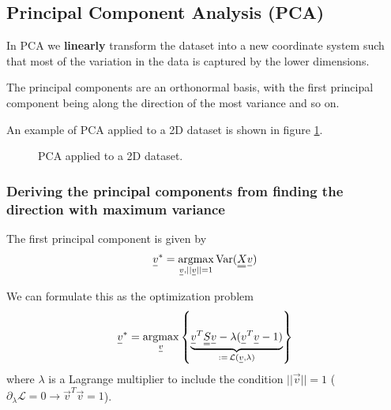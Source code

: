 \subsection{Principal Component Analysis (PCA)}
In PCA we \textbf{linearly} transform the dataset into a new coordinate system such that
most of the variation in the data is captured by the lower dimensions.

The principal components are an orthonormal basis, with the first principal component
being along the direction of the most variance and so on.

An example of PCA applied to a 2D dataset is shown in figure \ref{fig:pca}.

\begin{figure}[!htb]
    \centering
    
    \caption{PCA applied to a 2D dataset.}
    \label{fig:pca}
\end{figure}

\subsubsection{Deriving the principal components from finding the direction with maximum variance}

The first principal component is given by
\begin{equation}
    \vec{v}^* = \argmax_{\vec{v}, ||\vec{v}|| = 1} \Var(\mat{X}\vec{v})
\end{equation}

We can formulate this as the optimization problem
\begin{equation}
    \vec{v}^* = \argmax_{\vec{v}} \left\{ \underbrace{\vec{v}^T \mat{S} \vec{v} - \lambda (\vec{v}^T \vec{v} - 1)}_{:=\,\mathcal{L}(\vec{v},\lambda)} \right\}
\end{equation}
where $\lambda$ is a Lagrange multiplier to include the condition $||\vec{v}|| = 1$ ($\partial_{\lambda} \mathcal{L} = 0
\rightarrow \vec{v}^T \vec{v} = 1$).

